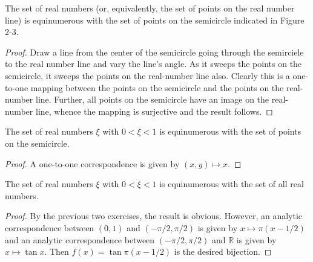 \begin{exercise}[2.3]
  The set of real numbers (or, equivalently, the set of points on the real number line) is equinumerous with the set of points on the semicircle indicated in Figure 2-3.
\end{exercise}
\begin{proof}
  Draw a line from the center of the semicircle going through the semirciele to the real number line and vary the line's angle.
  As it sweeps the points on the semicircle, it sweeps the points on the real-number line also.
  Clearly this is a one-to-one mapping between the points on the semicircle and the points on the real-number line.
  Further, all points on the semicircle have an image on the real-number line, whence the mapping is surjective and the result follows.
\end{proof}

\begin{exercise}[2.4]
  The set of real numbers $\xi$ with $0 < \xi < 1$ is equinumerous with the set of points on the semicircle.
\end{exercise}
\begin{proof}
  A one-to-one correspondence is given by $(x,y) \mapsto x$.
\end{proof}

\begin{exercise}[2.5]
  The set of real numbers $\xi$ with $0 < \xi < 1$ is equinumerous with the set of all real numbers.
\end{exercise}
\begin{proof}
  By the previous two exercises, the result is obvious.
  However, an analytic correspondence between $(0,1)$ and $(-\pi/2, \pi/2)$ is given by $x \mapsto \pi(x - 1/2)$ and an analytic correspondence between $(-\pi/2, \pi/2)$ and $\mathbb R$ is given by $x \mapsto \tan x$.
  Then $f(x) = \tan \pi(x - 1/2)$ is the desired bijection.
\end{proof}

